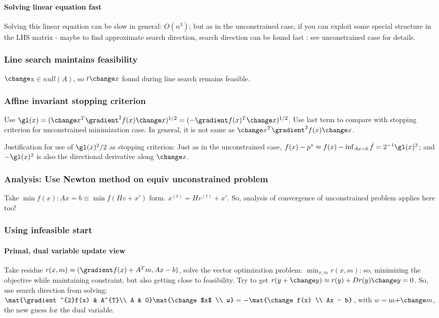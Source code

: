 \documentclass[oneside, article]{memoir}
\begin{document}
\paragraph*{Solving linear equation fast}
Solving this linear equation can be slow in general: $O(n^{3})$; but as in the unconstrained case, if you can exploit some special structure in the LHS matrix - maybe to find approximate search direction, search direction can be found fast : see unconstrained case for details.

\subsubsection{Line search maintains feasibility}
$\change $x$ \in null(A)$, so $t\change x$ found during line search remains feasible. 

\subsubsection{Affine invariant stopping criterion}
Use $\gl(x) = (\change x^{T} \gradient^{2}f(x) \change x)^{1/2} = (-\gradient f(x)^{T}\change x)^{1/2}$. Use last term to compare with stopping criterion for unconstrained minimization case. In general, it is not same as $\change x^{T} \gradient^{2}f(x) \change x$.

Justification for use of $\gl(x)^{2}/2$ as stopping criterion: Just as in the unconstrained case, $f(x) - p^{*} \approx f(x) - \inf_{Ax = b}\hat{f} = 2^{-1}\gl(x)^{2}$; and $-\gl(x)^{2}$ is also the directional derivative along $\change x$.

\subsubsection{Analysis: Use Newton method on equiv unconstrained problem}
Take $\min f(x): Ax = b \equiv \min f(Hv + x')$ form. $x^{(t)} = Hv^{(t)}+x'$. So, analysis of convergence of unconstrained problem applies here too!

\subsubsection{Using infeasible start}
\paragraph*{Primal, dual variable update view}
Take residue $r(x, m) = (\gradient f(x) + A^{T}m, Ax-b)$, solve the vector optimization problem: $\min_{x, m} r(x, m)$: so, minimizing the objective while maintaining constraint, but also getting close to feasibility. Try to get $r(y + \change y) \approx r(y) + Dr(y)\change y = 0$. So, use search direction from solving: \\
$\mat{\gradient^{2}f(x) & A^{T}\\ A & 0} \mat{\change $x$ \\ w} = -\mat{\change f(x) \\ Ax - b}$, with $w = $m$ + \change m$, the new guess for the dual variable.
\end{document}
